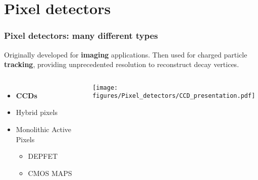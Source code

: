 \section{Pixel detectors}



    \begin{frame}
        \frametitle{Pixel detectors: many different types}
        Originally developed for \textbf{imaging} applications. Then used for charged particle \textbf{tracking}, providing unprecedented resolution to reconstruct decay vertices.\\\bigskip
        \pause
        \begin{columns}
                \begin{itemize}
                    \item \textbf{CCDs} 
                    \item Hybrid pixels 
                    \item Monolithic Active Pixels
                    \begin{itemize}
                        \item DEPFET %
                        \item CMOS MAPS
                    \end{itemize}
                \end{itemize}
            \medskip
                \centering\texttt{[image: figures/Pixel\_detectors/CCD\_presentation.pdf]} 
        \end{columns}

    \end{frame}



